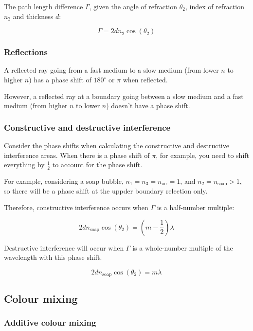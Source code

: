 \documentclass[12pt]{article}
\begin{document}
The path length difference $\Gamma$, given the angle of refraction $\theta_2$, index of refraction $n_2$ and thickness $d$:

\[
\boxed{
\Gamma = 2dn_2 \cos(\theta_2)
}
\]

\subsubsection{Reflections}

A reflected ray going from a fast medium to a slow medium (from lower $n$ to higher $n$) has a phase shift of $180^{\circ}$ or $\pi$ when reflected.

However, a reflected ray at a boundary going between a slow medium and a fast medium (from higher $n$ to lower $n$) doesn't have a phase shift.

\subsubsection{Constructive and destructive interference}

Consider the phase shifts when calculating the constructive and destructive interference areas.
When there is a phase shift of $\pi$, for example, you need to shift everything by $\frac{1}{2}$ to account for the phase shift.

For example, considering a soap bubble, $n_1 = n_3 = n_{\text{air}} = 1$, and $n_2 = n_{\text{soap}} > 1$, so there will be a phase shift at the uppder boundary relection only.

Therefore, constructive interference occurs when $\Gamma$ is a half-number multiple:

\[
\boxed{
2dn_{\text{soap}}\cos(\theta_2) = \left( m - \frac{1}{2} \right)\lambda
}
\]

Destructive interference will occur when $\Gamma$ is a whole-number multiple of the wavelength with this phase shift.

\[
\boxed{
2dn_{\text{soap}}\cos(\theta_2) = m\lambda
}
\]

\newpage

\subsection{Colour mixing}

\subsubsection{Additive colour mixing}
\end{document}
